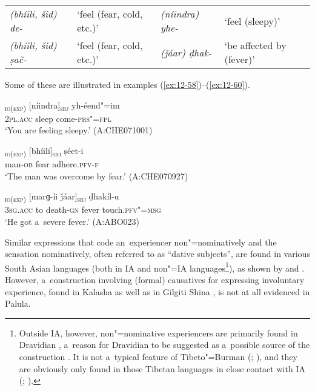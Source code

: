\begin{table}[H]
  \begin{tabularx}{\textwidth}{ Q Q Q Q }
\textit{(bhíili, šid) de-} &
`feel (fear, cold, etc.)' &
\textit{(níindra) yhe-} &
`feel (sleepy)'\\
\textit{(bhíili, šid) ṣač-} &
`feel (fear, cold, etc.)' &
\textit{(ǰáar) ḍhak-} &
`be affected by (fever)'\\
\end{tabularx}
\end{table}


Some of these are illustrated in examples (\ref{ex:12-58})--(\ref{ex:12-60}).

\begin{exe}
\ex
\label{ex:12-58}
\gll [tusaám]\textsubscript{\textsc{io(exp)}} [níindra]\textsubscript{\textsc{sbj}} yh-éend"=im \\
\textsc{2pl.acc} sleep come-\textsc{prs"=fpl} \\
\glt `You are feeling sleepy.' (A:CHE071001)

\ex
\label{ex:12-59}
\gll [míiš-a]\textsubscript{\textsc{io(exp)}} [bhíili]\textsubscript{\textsc{sbj}}
ṣéet-i \\
man-\textsc{ob} fear adhere.\textsc{pfv-f} \\
\glt `The man was overcome by fear.' (A:CHE070927)

\ex
\label{ex:12-60}
\textsubscript{\textsc{ io(exp)}} [marɡ-íi ǰáar]\textsubscript{\textsc{sbj}} ḍhakíl-u \\
3\textsc{sg.acc} to death-\textsc{gn} fever touch.\textsc{pfv"=msg} \\
\glt `He got a~severe fever.' (A:ABO023)
\end{exe}

Similar expressions that code an~experiencer non"=nominatively and the sensation nominatively, often referred to as ``dative subjects'', are found in various South Asian languages (both in IA and non"=IA languages\footnote{Outside IA, however, non"=nominative experiencers are primarily found in Dravidian \citep[260--263]{abbi1990}, a~reason for Dravidian to be suggested as a~possible source of the construction \citep[136]{hock1990}. It is not a~typical feature of Tibeto"=Burman (\citealt[260]{abbi1990}; \citealt[82]{bickel2004}), and they are obviously only found in those Tibetan languages in close contact with IA (\citealt[83, 88]{bickel2004}; \citealt[8--9]{noonan2003}).}), as shown by \citet[326--330]{hook1990b} and \citet[256--263]{abbi1990}. However, a~construction involving (formal) causatives for expressing involuntary experience, found in Kalasha \citep[310]{bashir1990} as well as in Gilgiti Shina \citep{hookzia2005}, is not at all evidenced in Palula. 



